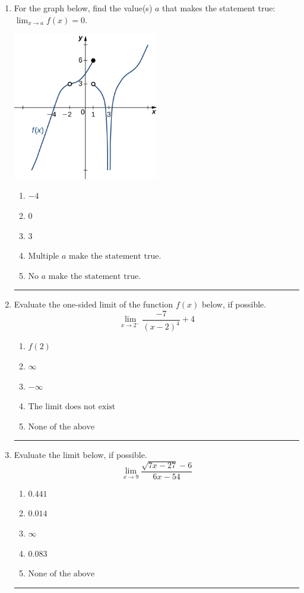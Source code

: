 \documentclass[14pt]{extbook}
\newcommand{\litem}[1]{\item#1\hspace*{-1cm}\rule{\textwidth}{0.4pt}}
\begin{document}
\begin{enumerate}
{\begin{enumerate}[label=\Alph*.]
\end{enumerate} }
\litem{
For the graph below, find the value(s) $a$ that makes the statement true: $ \displaystyle \lim_{x \rightarrow a} f(x) = 0$.
\begin{center}
    \includegraphics[width=0.5\textwidth]{../Figures/evaluateLimitGraphicallyCopyC.png}
\end{center}
\begin{enumerate}[label=\Alph*.]
\item \( -4 \)
\item \( 0 \)
\item \( 3 \)
\item \( \text{Multiple } a \text{ make the statement true}. \)
\item \( \text{No } a \text{ make the statement true}. \)

\end{enumerate} }
\litem{
Evaluate the one-sided limit of the function $f(x)$ below, if possible.\[ \lim_{x \rightarrow 2^-} \frac{-7}{(x-2)^4}+4 \]\begin{enumerate}[label=\Alph*.]
\item \( f(2) \)
\item \( \infty \)
\item \( -\infty \)
\item \( \text{The limit does not exist} \)
\item \( \text{None of the above} \)

\end{enumerate} }
\litem{
Evaluate the limit below, if possible.\[ \lim_{x \rightarrow 9} \frac{\sqrt{7x - 27} - 6}{6x - 54} \]\begin{enumerate}[label=\Alph*.]
\item \( 0.441 \)
\item \( 0.014 \)
\item \( \infty \)
\item \( 0.083 \)
\item \( \text{None of the above} \)


\end{enumerate}}
\end{enumerate}
\end{document}
